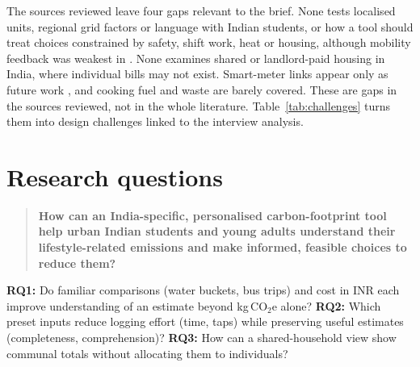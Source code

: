 \documentclass[10pt,a4paper,twocolumn]{article}
\begin{document}
The sources reviewed leave four gaps relevant to the brief. None tests localised units, regional grid factors or language with Indian students, or how a tool should treat choices constrained by safety, shift work, heat or housing, although mobility feedback was weakest in \cite{hoffmann2024}. None examines shared or landlord-paid housing in India, where individual bills may not exist. Smart-meter links appear only as future work \cite{hoffmann2024}, and cooking fuel and waste are barely covered. These are gaps in the sources reviewed, not in the whole literature. Table~\ref{tab:challenges} turns them into design challenges linked to the interview analysis.

\section{Research questions}
\begin{quote}
\small
\textbf{How can an India-specific, personalised carbon-footprint tool help urban Indian students and young adults understand their lifestyle-related emissions and make informed, feasible choices to reduce them?}
\end{quote}
\textbf{RQ1:} Do familiar comparisons (water buckets, bus trips) and cost in INR each improve understanding of an estimate beyond kg\,CO$_2$e alone? \textbf{RQ2:} Which preset inputs reduce logging effort (time, taps) while preserving useful estimates (completeness, comprehension)? \textbf{RQ3:} How can a shared-household view show communal totals without allocating them to individuals?
\end{document}
